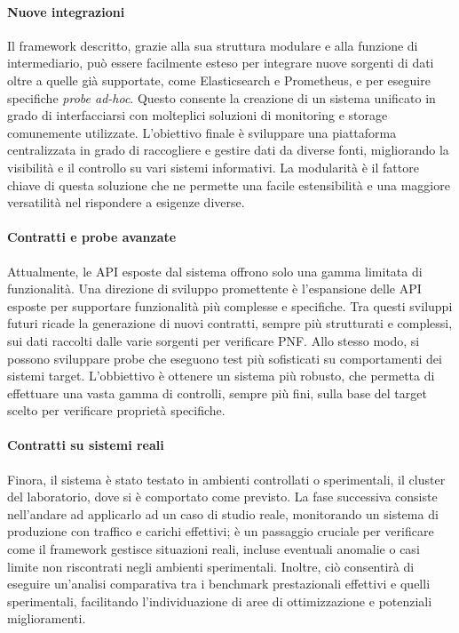 \paragraph{Nuove integrazioni}
Il framework descritto, grazie alla sua struttura modulare e alla funzione di intermediario, può essere facilmente esteso per integrare nuove sorgenti di dati oltre a quelle già supportate, come Elasticsearch e Prometheus, e per eseguire specifiche \textit{probe ad-hoc}. 
Questo consente la creazione di un sistema unificato in grado di interfacciarsi con molteplici soluzioni di monitoring e storage comunemente utilizzate.
L'obiettivo finale è sviluppare una piattaforma centralizzata in grado di raccogliere e gestire dati da diverse fonti, migliorando la visibilità e il controllo su vari sistemi informativi.
La modularità è il fattore chiave di questa soluzione che ne permette una facile estensibilità e una maggiore versatilità nel rispondere a esigenze diverse.


\paragraph{Contratti e probe avanzate}
Attualmente, le \gls{API} esposte dal sistema offrono solo una gamma limitata di funzionalità.
Una direzione di sviluppo promettente è l'espansione delle \gls{API} esposte per supportare funzionalità più complesse e specifiche.
Tra questi sviluppi futuri ricade la generazione di nuovi contratti, sempre più strutturati e complessi, sui dati raccolti dalle varie sorgenti per verificare \gls{PNF}.
Allo stesso modo, si possono sviluppare probe che eseguono test più sofisticati su comportamenti dei sistemi target.
L'obbiettivo è ottenere un sistema più robusto, che permetta di effettuare una vasta gamma di controlli, sempre più fini, sulla base del target scelto per verificare proprietà specifiche.

\paragraph{Contratti su sistemi reali}
Finora, il sistema è stato testato in ambienti controllati o sperimentali, il cluster del laboratorio, dove si è comportato come previsto.
La fase successiva consiste nell'andare ad applicarlo ad un caso di studio reale, monitorando un sistema di produzione con traffico e carichi effettivi; è un passaggio cruciale per verificare come il framework gestisce situazioni reali, incluse eventuali anomalie o casi limite non riscontrati negli ambienti sperimentali.
Inoltre, ciò consentirà di eseguire un'analisi comparativa tra i benchmark prestazionali effettivi e quelli sperimentali, facilitando l'individuazione di aree di ottimizzazione e potenziali miglioramenti.

